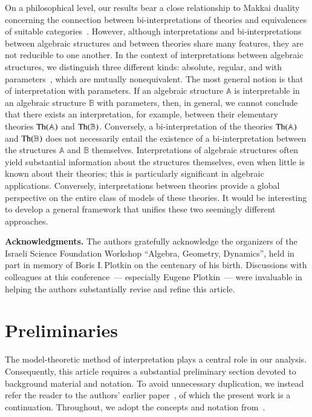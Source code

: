 \documentclass[12pt]{article}
\theoremstyle{definition}
\def\MA{{\mathbb{A}}}
\def\MB{{\mathbb{B}}}
\begin{document}
On a philosophical level, our results bear a close relationship to Makkai duality concerning the connection between bi-interpretations of theories and equivalences of suitable categories~\cite{Aratake, DPM, Makkai, MakkaiReyes}. However, although interpretations and bi-interpretations between algebraic structures and between theories share many features, they are not reducible to one another. In the context of interpretations between algebraic structures, we distinguish three different kinds: absolute, regular, and with parameters~\cite{Th_int1, KhMS}, which are mutually nonequivalent. The most general notion is that of interpretation with parameters. If an algebraic structure $\MA$ is interpretable in an algebraic structure $\MB$ with parameters, then, in general, we cannot conclude that there exists an interpretation, for example, between their elementary theories ${\rm Th}(\MA)$ and ${\rm Th}(\MB)$. Conversely, a bi-interpretation of the theories ${\rm Th}(\MA)$ and ${\rm Th}(\MB)$ does not necessarily entail the existence of a bi-interpretation between the structures $\MA$ and $\MB$ themselves. Interpretations of algebraic structures often yield substantial information about the structures themselves, even when little is known about their theories; this is particularly significant in algebraic applications. Conversely, interpretations between theories provide a global perspective on the entire class of models of these theories. It would be interesting to develop a general framework that unifies these two seemingly different approaches.

{\bf Acknowledgments.} The authors gratefully acknowledge the organizers of the Israeli Science Foundation Workshop ``Algebra, Geometry, Dynamics'', held in part in memory of Boris I.\,Plotkin on the centenary of his birth. Discussions with colleagues at this conference~--- especially Eugene Plotkin~--- were invaluable in helping the authors substantially revise and refine this article.

\section{Preliminaries}\label{sec:prelim}

The model-theoretic method of interpretation plays a central role in our analysis. Consequently, this article requires a substantial preliminary section devoted to background material and notation. To avoid unnecessary duplication, we instead refer the reader to the authors' earlier paper~\cite{Th_int1}, of which the present work is a continuation. Throughout, we adopt the concepts and notation from~\cite[Subsections~2.1--2.4, 2.6--2.8, 3.1, 4.1, 4.2, 4.4]{Th_int1}.
\end{document}
